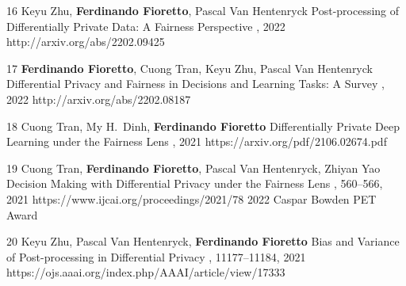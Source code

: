 \documentclass[localFont,alternative]{documentMETADATA}
\begin{document}
\begin{pubs}
	\confentryShort
	{16} %
	{Keyu Zhu, {\bf Ferdinando Fioretto}, Pascal Van Hentenryck}
	{Post-processing of Differentially Private Data: A Fairness Perspective}
	{\procIJCAI, 2022}
	{http://arxiv.org/abs/2202.09425}	

	\confentryShort
	{17} %
	{{\bf Ferdinando Fioretto}, {Cuong Tran}, Keyu Zhu, Pascal Van Hentenryck}
	{Differential Privacy and Fairness in Decisions and Learning Tasks: A Survey}
	{\procIJCAI, 2022}
	{http://arxiv.org/abs/2202.08187}	


	\confentryShort 
	{18} %
	{{Cuong Tran}, {My H.~Dinh}, {\bf Ferdinando Fioretto}}
	{Differentially Private Deep Learning under the Fairness Lens}
	{\procNeurIPS, 2021}
	{https://arxiv.org/pdf/2106.02674.pdf}

	\confentryShortAwd 
	{19} %
	{{Cuong Tran}, {\bf Ferdinando Fioretto}, Pascal Van Hentenryck, {Zhiyan Yao}}
	{Decision Making with Differential Privacy under the Fairness Lens}
	{\procIJCAI, 560--566, 2021}
	{https://www.ijcai.org/proceedings/2021/78}
	{2022 Caspar Bowden PET Award}

	\confentryShort 
	{20} %
	{Keyu Zhu, Pascal Van Hentenryck, {\bf Ferdinando Fioretto}}
	{Bias and Variance of Post-processing in Differential Privacy}
	{\procAAAI, 11177--11184, 2021}
	{https://ojs.aaai.org/index.php/AAAI/article/view/17333}


\end{pubs}

\end{document}
